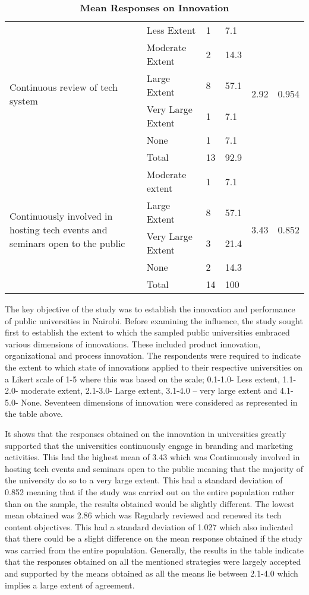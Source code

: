 \begin{table}[ht]
\begin{tabular}{|p{3.8cm}|l|l|l|l|l|}
   \multirow{6}{3cm}{Continuous review of tech system} & Less Extent & 1 & 7.1 & \multirow{6}{3cm}{2.92} & \multirow{6}{3cm}{0.954}\\  
   & Moderate Extent & 2 & 14.3 & & \\ 
   & Large Extent & 8 & 57.1 & &\\ 
   & Very Large Extent & 1 & 7.1 & &\\ 
   & None & 1 & 7.1 & &\\ 
   & Total & 13 & 92.9 & &\\ \hline

   \multirow{5}{3cm}{Continuously involved in hosting tech events and seminars open to the public} & Moderate extent & 1 & 7.1 & \multirow{5}{3cm}{3.43} & \multirow{5}{3cm}{0.852}\\  
   & Large Extent & 8 & 57.1 & &\\ 
   & Very Large Extent & 3 & 21.4 & &\\ 
   & None & 2 & 14.3 & &\\ 
   & Total & 14 & 100 & &\\ \hline
    \end{tabular}
    \caption{ \textbf{Mean Responses on Innovation}}
\end{table}

The key objective of the study was to establish the innovation and performance of public universities in Nairobi. Before examining the influence, the study sought first to establish the extent to which the sampled public universities embraced various dimensions of innovations. These included product innovation, organizational and process innovation. The respondents were required to indicate the extent to which state of innovations applied to their respective universities on a Likert scale of 1-5 where this was based on the scale; 0.1-1.0- Less extent, 1.1-2.0- moderate extent, 2.1-3.0- Large extent, 3.1-4.0 – very large extent and 4.1-5.0- None. Seventeen dimensions of innovation were considered as represented in the table above.

It shows that the responses obtained on the innovation in universities greatly supported that the universities continuously engage in branding and marketing activities. This had the highest mean of 3.43 which was Continuously involved in hosting tech events and seminars open to the public meaning that the majority of the university do so to a very large extent. This had a standard deviation of 0.852 meaning that if the study was carried out on the entire population rather than on the sample, the results obtained would be slightly different. The lowest mean obtained was 2.86 which was Regularly reviewed and renewed its tech content objectives. This had a standard deviation of 1.027 which also indicated that there could be a slight difference on the mean response obtained if the study was carried from the entire population. Generally, the results in the table indicate that the responses obtained on all the mentioned strategies were largely accepted and supported by the means obtained as all the means lie between 2.1-4.0 which implies a large extent of agreement.	

